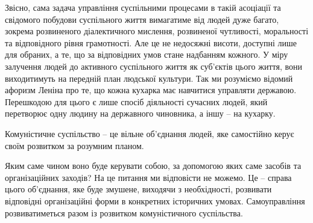 \documentclass[../main]{subfiles}
\begin{document}
Звісно, сама задача управління суспільними процесами в такій асоціації та свідомого побудови суспільного життя вимагатиме від людей дуже багато, зокрема розвиненого діалектичного мислення, розвиненої чутливості, моральності та відповідного рівня грамотності. Але це не недосяжні висоти, доступні лише для обраних, а те, що за відповідних умов стане надбанням кожного. У міру залучення людей до активного суспільного життя як суб’єктів цього життя, вони виходитимуть на передній план людської культури. Так ми розуміємо відомий афоризм Леніна про те, що кожна кухарка має навчитися управляти державою. Перешкодою для цього є лише спосіб діяльності сучасних людей, який перетворює одну людину на державного чиновника, а іншу – на кухарку.

Комуністичне суспільство – це вільне об’єднання людей, яке самостійно керує своїм розвитком за розумним планом.

Яким саме чином воно буде керувати собою, за допомогою яких саме засобів та організаційних заходів? На це питання ми відповісти не можемо. Це – справа цього об’єднання, яке буде змушене, виходячи з необхідності, розвивати відповідні організаційні форми в конкретних історичних умовах. Самоуправління розвиватиметься разом із розвитком комуністичного суспільства.
\end{document}
